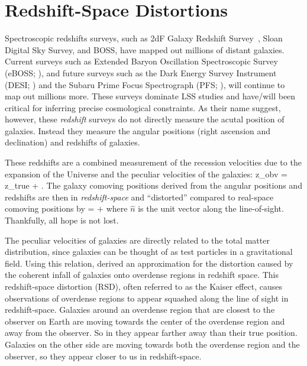 \section{Redshift-Space Distortions} \label{sec:rsd}
Spectroscopic redshifts surveys, such as 2dF Galaxy Redshift Survey~\citep{Colless:1999aa}, 
Sloan Digital Sky Survey, and BOSS, have mapped out millions of distant galaxies. 
Current surveys such as Extended Baryon Oscillation 
Spectroscopic Survey (eBOSS; \citealt{Dawson:2015aa}), and future surveys such as 
the Dark Energy Survey Instrument (DESI; \citealt{Schlegel:2011aa, Morales:2012aa, Makarem:2014aa}) 
and the Subaru Prime Focus Spectrograph (PFS; \citealt{Takada:2014aa}), will 
continue to map out millions more. These surveys dominate LSS studies and have/will 
been critical for inferring precise cosmological constraints. As their name suggest, 
however, these {\em redshift} surveys do not directly measure the acutal position of 
galaxies. Instead they measure the angular positions (right ascension and declination) 
and redshifts of galaxies. 

These redshifts are a combined measurement of the recession velocities due to 
the expansion of the Universe and the peculiar velocities of the galaxies:
\beq
z_{obv} = z_{true} +  .
\eeq 
The galaxy comoving positions derived from the angular positions and redshifts are then
in {\em redshift-space} and ``distorted'' compared to real-space comoving positions by 
\beq
{} =  +  
\eeq 
where $\hat{n}$ is the unit vector along the line-of-sight. Thankfully, all hope is not 
lost. 

The peculiar velocities of galaxies are directly related to the total 
matter distribution, since galaxies can be thought of as test particles in a 
gravitational field. Using this relation, \cite{Kaiser:1984aa} derived an 
approximation for the distortion caused by the coherent infall of galaxies 
onto overdense regions in redshift space. This redshift-space 
distortion (RSD), often referred to as the Kaiser effect, causes observations of 
overdense regions
to appear squashed along the line of sight in redshift-space. Galaxies around an
overdense region that are closest to the observer on Earth are moving towards the center of the 
overdense region and away from the observer. So in they appear farther away than 
their true position. Galaxies on the other side are moving towards both the overdense 
region and the observer, so they appear closer to us in redshift-space. 

